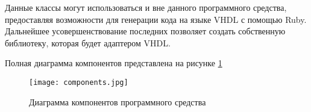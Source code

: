 Данные классы могут использоваться и вне данного программного средства, предоставляя возможности для генерации кода на языке VHDL с помощью Ruby. Дальнейшее усовершенствование последних позволяет создать собственную библиотеку, которая будет адаптером VHDL.

Полная диаграмма компонентов представлена на рисунке \ref{fig:arch_and_mod::components}


\begin{figure}[!htb]
  \centering
  \texttt{[image: components.jpg]}
  \caption{ Диаграмма компонентов программного средства }
  \label{fig:arch_and_mod::components}
\end{figure}
